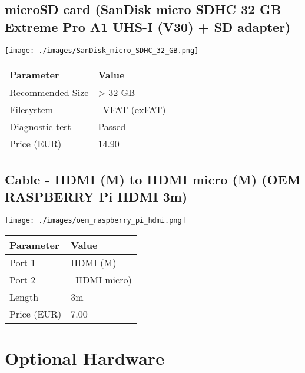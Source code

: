 \documentclass[10pt, a4paper, onecolumn, openany]{book} %
\begin{document}
\subsection{microSD card (SanDisk micro SDHC 32 GB Extreme Pro A1 UHS-I (V30) + SD adapter)}
\begin{center}
    \texttt{[image: ./images/SanDisk\_micro\_SDHC\_32\_GB.png]}
\end{center}
\begin{center}
    \begin{small}
    \begin{tabular}{|p{4cm}|p{4cm}|}
    \hline
    \textbf{Parameter} & \textbf{Value} \\
    \hline
    Recommended Size & > 32 GB \\
    \hline
    Filesystem & \ VFAT (exFAT) \\
    \hline
    Diagnostic test & Passed \\
    \hline
    Price (EUR) & 14.90 \\
    \hline
    \end{tabular}
    \end{small}
\end{center}

\subsection{Cable - HDMI (M) to HDMI micro (M) (OEM RASPBERRY Pi HDMI 3m)}
\begin{center}
    \texttt{[image: ./images/oem\_raspberry\_pi\_hdmi.png]}
\end{center}
\begin{center}
    \begin{small}
    \begin{tabular}{|p{4cm}|p{4cm}|}
    \hline
    \textbf{Parameter} & \textbf{Value} \\
    \hline
    Port 1 & HDMI (M) \\
    \hline
    Port 2 & \ HDMI micro) \\
    \hline
    Length & 3m \\
    \hline
    Price (EUR) & 7.00 \\
    \hline
    \end{tabular}
    \end{small}
\end{center}

\section{Optional Hardware}
\end{document}
